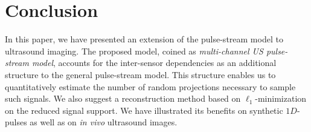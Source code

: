 \documentclass{article}
\theoremstyle{definition}
\begin{document}
\section{Conclusion}
\label{sec_concl}
In this paper, we have presented an extension of the pulse-stream model to ultrasound imaging. The proposed model, coined as \textit{multi-channel US pulse-stream model}, accounts for the inter-sensor dependencies as an additional structure to the general pulse-stream model. This structure enables us to quantitatively estimate the number of random projections necessary to sample such signals. We also suggest a reconstruction method based on $\ell_1$-minimization on the reduced signal support. We have illustrated its benefits on synthetic $1D$-pulses as well as on \textit{in vivo} ultrasound images.






%





\end{document}
